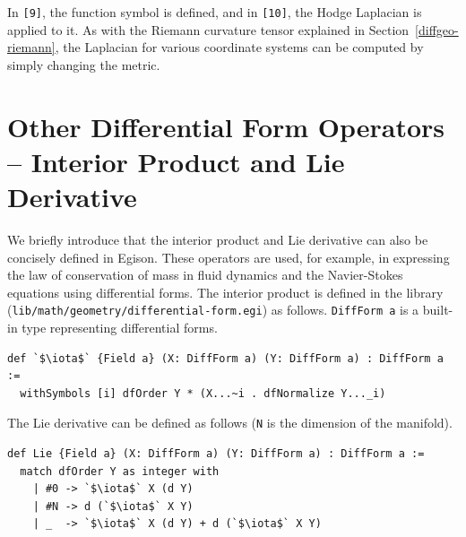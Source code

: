In \texttt{[9]}, the function symbol is defined, and in \texttt{[10]}, the Hodge Laplacian is applied to it.
As with the Riemann curvature tensor explained in Section~\ref{diffgeo-riemann}, the Laplacian for various coordinate systems can be computed by simply changing the metric.

\section{Other Differential Form Operators -- Interior Product and Lie Derivative}

We briefly introduce that the interior product and Lie derivative can also be concisely defined in Egison.
These operators are used, for example, in expressing the law of conservation of mass in fluid dynamics and the Navier-Stokes equations using differential forms.
The interior product is defined in the library (\texttt{lib/math/geometry/differential-form.egi}) as follows.
\lstinline{DiffForm a} is a built-in type representing differential forms.
\begin{lstlisting}[language=egison,numbers=none]
def `$\iota$` {Field a} (X: DiffForm a) (Y: DiffForm a) : DiffForm a :=
  withSymbols [i] dfOrder Y * (X...~i . dfNormalize Y..._i)
\end{lstlisting}
The Lie derivative can be defined as follows (\lstinline{N} is the dimension of the manifold).
\begin{lstlisting}[language=egison,numbers=none]
def Lie {Field a} (X: DiffForm a) (Y: DiffForm a) : DiffForm a :=
  match dfOrder Y as integer with
    | #0 -> `$\iota$` X (d Y)
    | #N -> d (`$\iota$` X Y)
    | _  -> `$\iota$` X (d Y) + d (`$\iota$` X Y)
\end{lstlisting}
